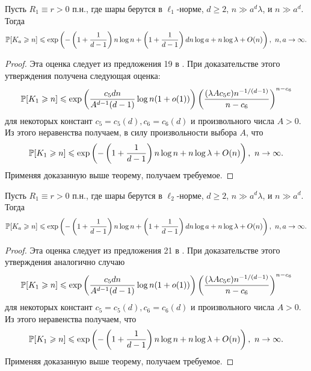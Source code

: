 \begin{cor}
Пусть $R_1\equiv r > 0$ п.н., где шары берутся в $\ell_1$-норме, $d\geq 2$, $n \gg a^d\lambda$, и $n\gg a^d$. 
Тогда $$\mathbb{P}[K_a \geqslant n] \leqslant \exp \left(-\left(1+\dfrac{1}{d-1}\right)n\log n + \left(1+\dfrac{1}{d-1}\right)dn\log a  +n\log\lambda + O(n)\right),\  n, a\to \infty.$$
\end{cor}{}

\begin{proof}
    Эта оценка следует из предложения 19 в \cite{AL}. При доказательстве этого утверждения получена следующая оценка:
    $$\mathbb{P}[K_1 \geqslant n] \leqslant \exp\left(\dfrac{c_5 dn}{A^{d-1}(d-1)}\log n(1 + o(1))\right)\left(\dfrac{(\lambda Ac_5e)n^{-1/(d-1)}}{n-c_6}\right)^{n-c_6}$$ для некоторых констант $c_5 = c_5(d), c_6 = c_6(d)$ и произвольного числа $A>0$. Из этого неравенства получаем, в силу произвольности выбора $A$, что
    $$\mathbb{P} [K_1 \geqslant n] \leqslant \exp \left(-\left(1+\dfrac{1}{d-1}\right)n\log n   +n\log\lambda + O(n)\right),\  n \to \infty.$$ Применяя доказанную выше теорему, получаем требуемое.
\end{proof}{}

\begin{cor}
Пусть $R_1\equiv r > 0$ п.н., где шары берутся в $\ell_2$-норме, $d\geq 2$, $n \gg a^d\lambda$, и $n\gg a^d$. 
Тогда $$\mathbb{P}[K_a \geqslant n] \leqslant \exp \left(-\left(1+\dfrac{1}{d-1}\right)n\log n + \left(1+\dfrac{1}{d-1}\right)dn\log a  +n\log\lambda + O(n)\right),\  n, a\to \infty.$$
\end{cor}{}

\begin{proof}
    Эта оценка следует из предложения 21 в \cite{AL}. При доказательстве этого утверждения аналогично случаю $$\mathbb{P}[K_1 \geqslant n] \leqslant \exp\left(\dfrac{c_5 dn}{A^{d-1}(d-1)}\log n(1 + o(1))\right)\left(\dfrac{(\lambda Ac_5e)n^{-1/(d-1)}}{n-c_6}\right)^{n-c_6}$$ для некоторых констант $c_5 = c_5(d), c_6 = c_6(d)$ и произвольного числа $A>0$. Из этого неравенства получаем, что
    $$\mathbb{P}[K_1 \geqslant n] \leqslant \exp \left(-\left(1+\dfrac{1}{d-1}\right)n\log n   +n\log\lambda + O(n)\right),\  n \to \infty.$$ Применяя доказанную выше теорему, получаем требуемое.
\end{proof}{}


